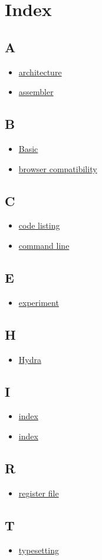 \documentclass[11pt]{article}
\date{\today}
\title{}
\begin{document}
\section{Index}
\label{sec:org4d51262}
\subsection{A}
\label{sec:orgc61ad33}
\begin{itemize}
\item \href{Sigma16UserGuide.org}{architecture}
\item \href{Sigma16UserGuide.org}{assembler}
\end{itemize}
\subsection{B}
\label{sec:org89cb258}
\begin{itemize}
\item \href{Sigma16UserGuide.org}{Basic}
\item \href{Sigma16UserGuide.org}{browser compatibility}
\end{itemize}
\subsection{C}
\label{sec:org478ea6d}
\begin{itemize}
\item \href{Sigma16UserGuide.org}{code listing}
\item \href{Sigma16UserGuide.org}{command line}
\end{itemize}
\subsection{E}
\label{sec:orgff1f317}
\begin{itemize}
\item \href{Test.org}{experiment}
\end{itemize}
\subsection{H}
\label{sec:org0ffc016}
\begin{itemize}
\item \href{Sigma16UserGuide.org}{Hydra}
\end{itemize}
\subsection{I}
\label{sec:orgbd1a52d}
\begin{itemize}
\item \href{Test.org}{index}
\item \href{Sigma16UserGuide.org}{index}
\end{itemize}
\subsection{R}
\label{sec:orgb395ed0}
\begin{itemize}
\item \href{Sigma16UserGuide.org}{register file}
\end{itemize}
\subsection{T}
\label{sec:org2160cbe}
\begin{itemize}
\item \href{Test.org}{typesetting}
\end{itemize}
\end{document}
